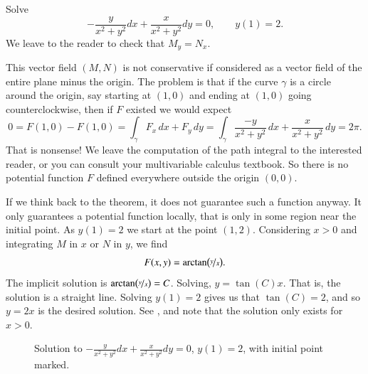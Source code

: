 \documentclass[12pt]{book}
\begin{document}
\begin{example}
Solve
\begin{equation*}
-\frac{y}{x^2+y^2} dx + \frac{x}{x^2+y^2} dy = 0 , \qquad y(1) = 2.
\end{equation*}
We leave to the reader to check that
$M_y = N_x$.

This vector field $(M,N)$ is not conservative if considered as a vector
field of the entire plane minus the origin.  The problem is that if the curve $\gamma$
is a circle around the origin, say starting at $(1,0)$ and
ending at $(1,0)$ going counterclockwise, then if $F$ existed we would expect
\begin{equation*}
0 = F(1,0) - F(1,0) = \int_\gamma F_x \, dx + F_y \, dy = \int_\gamma \frac{-y}{x^2+y^2} \, dx +
\frac{x}{x^2+y^2} \, dy = 2\pi .
\end{equation*}
That is nonsense!
We leave the computation of the path integral to the interested reader, or
you can consult your multivariable calculus textbook.  So there is no
potential function $F$ defined everywhere outside the origin $(0,0)$.

If we think back to the theorem, it does not guarantee such a function
anyway.  It only guarantees a potential function locally, that is only in
some region near the initial point.  As $y(1) = 2$
we start at the point $(1,2)$.  Considering $x > 0$ and
integrating $M$ in $x$ or $N$ in $y$, we find
\begin{equation*}
F(x,y) = \operatorname{arctan} \bigl( \nicefrac{y}{x} \bigr) .
\end{equation*}
The implicit solution is 
$\operatorname{arctan} \bigl( \nicefrac{y}{x} \bigr) = C$.  Solving,
$y = \tan(C) x$.  That is, the solution is a straight line.  Solving $y(1) =
2$ gives us that $\tan(C) = 2$, and so $y= 2x$ is the desired solution.
See , and note that the solution only exists for $x >
0$.
\begin{figure}[h!t]
\capstart
\begin{center}
\caption{Solution to 
$-\frac{y}{x^2+y^2} dx + \frac{x}{x^2+y^2} dy = 0$, $y(1) = 2$,
with initial point marked.\label{exact:y2x}}
\end{center}
\end{figure}
\end{example}
\end{document}
